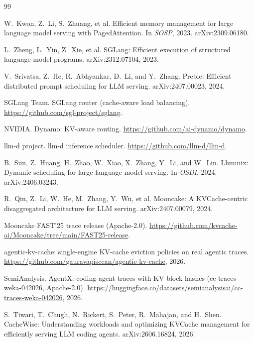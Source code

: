 \documentclass[10pt,twocolumn]{article}
\begin{document}
\small
\begin{thebibliography}{99}\setlength{\itemsep}{1pt}

W.~Kwon, Z.~Li, S.~Zhuang, et al.
\newblock Efficient memory management for large language model serving with PagedAttention.
\newblock In \emph{SOSP}, 2023. arXiv:2309.06180.

L.~Zheng, L.~Yin, Z.~Xie, et al.
\newblock SGLang: Efficient execution of structured language model programs.
\newblock arXiv:2312.07104, 2023.

V.~Srivatsa, Z.~He, R.~Abhyankar, D.~Li, and Y.~Zhang.
\newblock Preble: Efficient distributed prompt scheduling for LLM serving.
\newblock arXiv:2407.00023, 2024.

SGLang Team.
\newblock SGLang router (cache-aware load balancing).
\newblock \url{https://github.com/sgl-project/sglang}.

NVIDIA.
\newblock Dynamo: KV-aware routing.
\newblock \url{https://github.com/ai-dynamo/dynamo}.

llm-d project.
\newblock llm-d inference scheduler.
\newblock \url{https://github.com/llm-d/llm-d}.

B.~Sun, Z.~Huang, H.~Zhao, W.~Xiao, X.~Zhang, Y.~Li, and W.~Lin.
\newblock Llumnix: Dynamic scheduling for large language model serving.
\newblock In \emph{OSDI}, 2024. arXiv:2406.03243.

R.~Qin, Z.~Li, W.~He, M.~Zhang, Y.~Wu, et al.
\newblock Mooncake: A KVCache-centric disaggregated architecture for LLM serving.
\newblock arXiv:2407.00079, 2024.

Mooncake FAST'25 trace release (Apache-2.0).
\newblock \url{https://github.com/kvcache-ai/Mooncake/tree/main/FAST25-release}.

agentic-kv-cache: single-engine KV-cache eviction policies on real agentic traces.
\newblock \url{https://github.com/gauravapiscean/agentic-kv-cache}, 2026.

SemiAnalysis.
\newblock AgentX: coding-agent traces with KV block hashes (cc-traces-weka-042026, Apache-2.0).
\newblock \url{https://huggingface.co/datasets/semianalysisai/cc-traces-weka-042026}, 2026.

S.~Tiwari, T.~Chugh, N.~Rickert, S.~Peter, R.~Mahajan, and H.~Shen.
\newblock CacheWise: Understanding workloads and optimizing KVCache management for efficiently
serving LLM coding agents.
\newblock arXiv:2606.16824, 2026.


\end{thebibliography}
\end{document}

